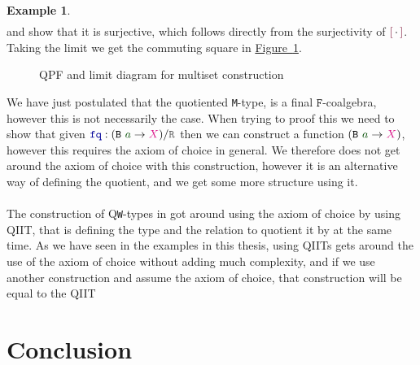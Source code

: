 \documentclass[twoside,11pt,openright]{report}
\theoremstyle{plain} %
\theoremstyle{definition}
\newtheorem{exmp}{Example} %
\theoremstyle{remark}
\newcommand*{\figref}[1]{\hyperref[fig:#1]{Figure~\ref*{fig:#1}}}
\newcommand*{\term}[1]{\textcolor{green!30!black}{#1}} %
\newcommand*{\type}[1]{\textcolor{magenta!90!black}{#1}}
\newcommand*{\relation}[1]{\textcolor{gray!75!black}{\ensuremath{\mathtt{#1}}}}
\newcommand*{\function}[1]{\textcolor{blue!60!black}{\ensuremath{\mathtt{#1}}}}
\newcommand*{\constructor}[1]{\textcolor{purple!60!black}{\ensuremath{\mathtt{#1}}}}
\newcommand*{\typeformer}[1]{\ensuremath{\mathtt{#1}}}
\newcommand*{\functor}[1]{\ensuremath{\mathbf{\mathtt{#1}}}}
\newcommand*{\quotientconstructor}[1]{\constructor{[}\,#1\,\constructor{]}}
\begin{document}
\begin{exmp}
\begin{equation}
\begin{aligned}
    \end{aligned}
  \end{equation}
  and show that it is surjective, which follows directly from the surjectivity of \(\quotientconstructor{{\cdot}}\). Taking the limit we get the commuting square in \figref{QPF-limit-multiset}.
  \begin{figure}[h]
  \centering
  \caption{QPF and limit diagram for multiset construction}
  \label{fig:QPF-limit-multiset}
\end{figure}
\end{exmp}
\noindent We have just postulated that the quotiented \texttt{M}-type, is a final \(\functor{F}\)-coalgebra, however this is not necessarily the case. When trying to proof this we need to show that given \(\function{fq} : (\typeformer{B}~\term{a} \rightarrow \type{X}) / \relation{R}\) then we can construct a function \((\typeformer{B}~\term{a} \rightarrow \type{X})\), however this requires the axiom of choice in general. We therefore does not get around the axiom of choice with this construction, however it is an alternative way of defining the quotient, and we get some more structure using it.
\\ \\
The construction of Q\texttt{W}-types in \cite{DBLP:Constructing-QIITs} got around using the axiom of choice by using QIIT, that is defining the type and the relation to quotient it by at the same time. As we have seen in the examples in this thesis, using QIITs gets around the use of the axiom of choice without adding much complexity, and if we use another construction and assume the axiom of choice, that construction will be equal to the QIIT 

\chapter{Conclusion}
\label{ch:conclusion}
\end{document}

